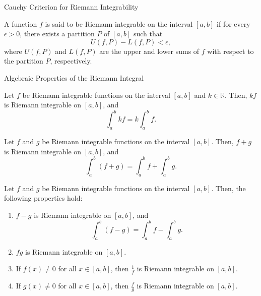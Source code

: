 \documentclass[12pt,a4paper]{article}
\begin{document}
\FrontPage
\Large

\begin{heading}
    Cauchy Criterion for Riemann Integrability
\end{heading}

\vspace{10pt}

\begin{definition}
    A function $f$ is said to be Riemann integrable on the interval $[a,b]$ if for every $\epsilon > 0$, there exists a partition $P$ of $[a,b]$ such that
    \[
        U(f,P) - L(f,P) < \epsilon,
    \]
    where $U(f,P)$ and $L(f,P)$ are the upper and lower sums of $f$ with respect to the partition $P$, respectively.
    
\end{definition}

\clearpage

\begin{heading}
    Algebraic Properties of the Riemann Integral
\end{heading}

\vspace{10pt}

\begin{theorem}
    Let $f$ be Riemann integrable functions on the interval $[a,b]$ and $k \in \mathbb{R}$. Then, $kf$ is Riemann integrable on $[a,b]$, and
    \[
        \int_a^b kf = k \int_a^b f.
    \]
\end{theorem}

\clearpage

\begin{theorem}
    Let $f$ and $g$ be Riemann integrable functions on the interval $[a,b]$. Then, $f+g$ is Riemann integrable on $[a,b]$, and
    \[
        \int_a^b (f + g) = \int_a^b f + \int_a^b g.
    \]
\end{theorem}

\clearpage

\begin{theorem}
    Let $f$ and $g$ be Riemann integrable functions on the interval $[a,b]$. Then, the following properties hold:
    \begin{enumerate}
        \item $f-g$ is Riemann integrable on $[a,b]$, and
        \[
            \int_a^b (f - g) = \int_a^b f - \int_a^b g.
        \]
        \item $fg$ is Riemann integrable on $[a,b]$.
        \item If $f(x) \neq 0$ for all $x \in [a,b]$, then $\frac{1}{f}$ is Riemann integrable on $[a,b]$.
        \item  If $g(x) \neq 0$ for all $x \in [a,b]$, then $\frac{f}{g}$ is Riemann integrable on $[a,b]$.
    \end{enumerate} 
\end{theorem}
    
\end{document}
